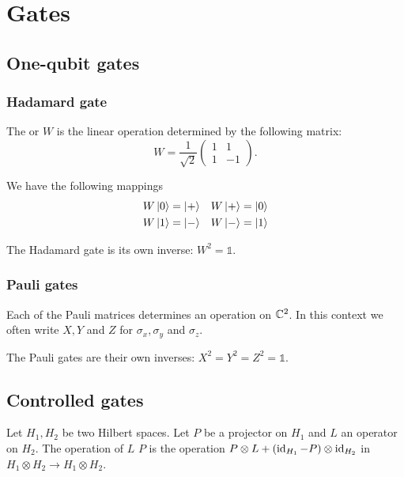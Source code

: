 \section{Gates}
\subsection{One-qubit gates}
\subsubsection{Hadamard gate}
\begin{definition}
The  or  $W$ is the linear operation determined by the following matrix:
\[ W = \frac{1}{\sqrt{2}}\begin{pmatrix}
1 & 1 \\ 1 & -1
\end{pmatrix}. \]
\end{definition}
We have the following mappings
\begin{align*}
W\left| 0 \right\rangle &= \left| + \right\rangle & W\left| + \right\rangle &= \left| 0 \right\rangle \\
W\left| 1 \right\rangle &= \left| - \right\rangle & W\left| - \right\rangle &= \left| 1 \right\rangle
\end{align*}

\begin{lemma}
The Hadamard gate is its own inverse: $W^2 = \mathbb{1}$.
\end{lemma}

\subsubsection{Pauli gates}
\begin{definition}
Each of the Pauli matrices determines an operation on $\mathbb{C}^2$. In this context we often write $X,Y$ and $Z$ for $\sigma_x, \sigma_y$ and $\sigma_z$.
\end{definition}

\begin{lemma}
The Pauli gates are their own inverses: $X^2 = Y^2 = Z^2 = \mathbb{1}$.
\end{lemma}

\subsection{Controlled gates}
\begin{definition}
Let $H_1, H_2$ be two Hilbert spaces. Let $P$ be a projector on $H_1$ and $L$ an operator on $H_2$. The operation of $L$  $P$ is the operation $P\otimes L + (\operatorname{id}_{H_1} - P)\otimes \operatorname{id}_{H_2}$ in $H_1\otimes H_2 \to H_1\otimes H_2$. 
\end{definition}

